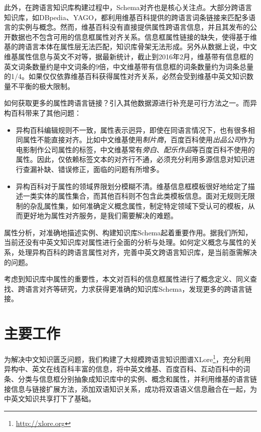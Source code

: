 此外，在跨语言知识库构建过程中，Schema对齐也是核心关注点。大部分跨语言知识库，如DBpedia、YAGO，都利用维基百科提供的跨语言词条链接来匹配多语言的实例与概念。然而，维基百科没有直接提供属性跨语言信息，并且其发布的公开数据也不包含可用的信息框属性对齐关系。信息框属性链接的缺失，使得基于维基的跨语言本体在属性层无法匹配，知识库骨架无法形成。另外从数据上说，中文维基属性信息与英文不对等，据最新统计，截止到2016年2月，维基带有信息框的英文词条数量约是中文词条的9倍，中文维基带有信息框的词条数量约为词条总量的1/4。如果仅仅依靠维基百科获得属性对齐关系，必然会受到维基中英文知识数量不平衡的极大限制。

如何获取更多的属性跨语言链接？引入其他数据源进行补充是可行方法之一。而异构百科带来了其他问题：
\begin{itemize}
\item {\heiti 异构百科编辑规则不一致}，属性表示迥异，即使在同语言情况下，也有很多相同属性不能直接对齐。比如中文维基使用\textit{制片商}，百度百科使用\textit{出品公司}作为电影制作公司属性的标签，中文维基常有\textit{旁白}、\textit{配乐作品}等百度百科不使用的属性。因此，仅依赖标签文本的对齐行不通，必须充分利用多源信息对知识进行查漏补缺、错误修正，面临的问题有所增多。
\item {\heiti 异构百科对于属性的领域界限划分模糊不清}。维基信息框模板很好地给定了描述一类实体的属性集合，而其他百科则不包含此类模板信息。面对无规则无限制的杂乱属性集，如何准确定义概念属性，制定特定领域下受认可的模板，从而更好地为属性对齐服务，是我们需要解决的难题。
\end{itemize}

属性分析，对准确地描述实例、构建知识库Schema起着重要作用。据我们所知，当前还没有中英文知识库对属性进行全面的分析与处理。如何定义概念与属性的关系，处理异构百科的跨语言属性对齐，完善中英文跨语言知识库，是当前亟需解决的问题。

考虑到知识库中属性的重要性，本文对百科的信息框属性进行了概念定义、同义查找、跨语言对齐等研究，力求获得更准确的知识库Schema，发现更多的跨语言链接。

\section{主要工作}
为解决中文知识匮乏问题，我们构建了大规模跨语言知识图谱XLore\footnote{\url{http://xlore.org}}，充分利用异构中、英文在线百科丰富的信息，将中英文维基、百度百科、互动百科中的词条、分类与信息框分别抽象成知识库中的实例、概念和属性，并利用维基的语言链接信息与链接扩展方法\cite{wang2012cross}，添加双语知识关系，成功将双语语义信息融合在一起，为中英文知识共享打下了基础。

